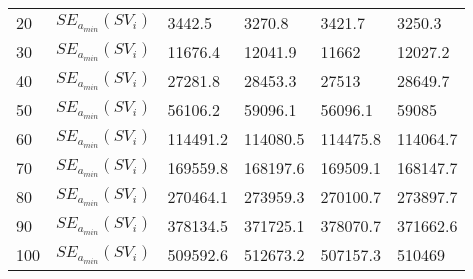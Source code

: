 \begin{table}[H]
\begin{tabular}{l l | l l | l l}
		20                                                          & $SE_{a_{min}}(SV_i)$                                                      & 3442.5                    & 3270.8                    & 3421.7                  & 3250.3                  \\
		30                                                          & $SE_{a_{min}}(SV_i)$                                                      & 11676.4                   & 12041.9                   & 11662                   & 12027.2                 \\
		40                                                          & $SE_{a_{min}}(SV_i)$                                                      & 27281.8                   & 28453.3                   & 27513                   & 28649.7                 \\
		50                                                          & $SE_{a_{min}}(SV_i)$                                                      & 56106.2                   & 59096.1                   & 56096.1                 & 59085                   \\
		60                                                          & $SE_{a_{min}}(SV_i)$                                                      & 114491.2                  & 114080.5                  & 114475.8                & 114064.7                \\
		70                                                          & $SE_{a_{min}}(SV_i)$                                                      & 169559.8                  & 168197.6                  & 169509.1                & 168147.7                \\
		80                                                          & $SE_{a_{min}}(SV_i)$                                                      & 270464.1                  & 273959.3                  & 270100.7                & 273897.7                \\
		90                                                          & $SE_{a_{min}}(SV_i)$                                                      & 378134.5                  & 371725.1                  & 378070.7                & 371662.6                \\
		100                                                         & $SE_{a_{min}}(SV_i)$                                                      & 509592.6                  & 512673.2                  & 507157.3                & 510469                 
	\end{tabular}
\end{table}

